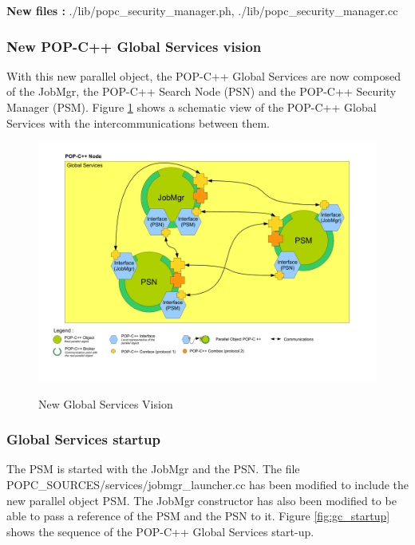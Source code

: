 \textbf{New files :} ./lib/popc\_security\_manager.ph, ./lib/popc\_security\_manager.cc

\pagebreak
\subsubsection{New POP-C++ Global Services vision}
With this new parallel object, the POP-C++ Global Services are now composed of the JobMgr, the POP-C++ Search Node (PSN) and the POP-C++ Security Manager (PSM). Figure \ref{fig:new_gc} shows a schematic view of the POP-C++ Global Services with the intercommunications between them.

\begin{figure}[ht]
	\caption{New Global Services Vision}
  	\centering
	\includegraphics[width=1.0\textwidth]{../global_services.pdf}
	\label{fig:new_gc}
\end{figure}

\pagebreak
\subsubsection{Global Services startup}
The PSM is started with the JobMgr and the PSN. The file POPC\_SOURCES/services/jobmgr\_launcher.cc has been modified to include the new parallel object PSM. The JobMgr constructor has also been modified to be able to pass a reference of the PSM and the PSN to it. Figure \ref{fig:gc_startup} shows the sequence  of the POP-C++ Global Services start-up.


